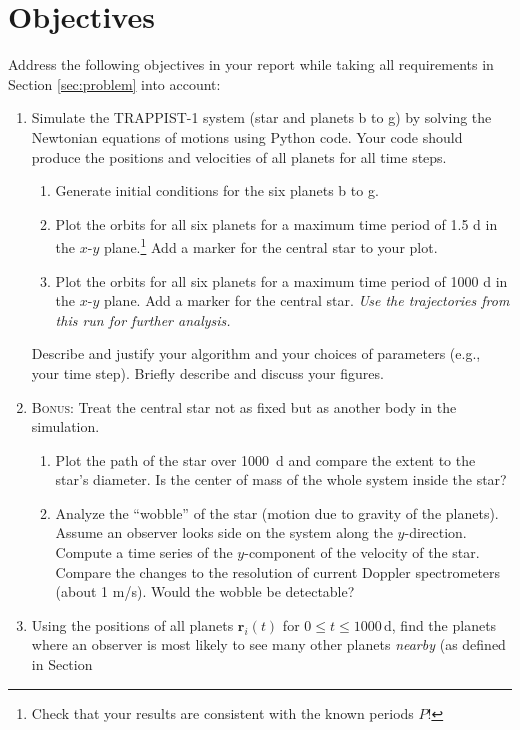 \documentclass[letterpaper]{scrartcl}
\newcommand{\BONUS}{\textsc{Bonus: }}
\newenvironment{enuma}{\begin{enumerate}[label=(\alph*)]}{\end{enumerate}}
\newenvironment{enumi}{\begin{enumerate}[label=(\roman*)]}{\end{enumerate}}
\renewcommand{\vec}[1]{\ensuremath{\mathbf{#1}}}
\begin{document}
\section{Objectives}
\label{sec:tasks}
Address the following objectives in your report while taking all
requirements in Section \ref{sec:problem} into account:
\begin{enuma}
\item Simulate the TRAPPIST-1 system (star and planets b to g) by
  solving the Newtonian equations of motions using Python code. Your
  code should produce the positions and velocities of all planets for
  all time steps.
  \begin{enumi}
  \item Generate initial conditions for the six planets b to g.
  \item Plot the orbits for all six planets for a maximum time period
    of 1.5 d in the $x$-$y$ plane.\footnote{Check that your results
      are consistent with the known periods $P$!} Add a marker for the
    central star to your plot.
  \item Plot the orbits for all six planets for a maximum time period
    of 1000 d in the $x$-$y$ plane. Add a marker for the central
    star. \emph{Use the trajectories from this run for further
      analysis.}
  \end{enumi}
  Describe and justify your algorithm and your choices of parameters (e.g., your
  time step). Briefly describe and discuss your figures.
\item \BONUS Treat the central star not as fixed but as another body
  in the simulation. 
  \begin{enumi}
  \item Plot the path of the star over 1000~d and compare the extent
    to the star's diameter. Is the center of mass of the whole system
    inside the star?
  \item Analyze the ``wobble'' of the star (motion due to gravity of
    the planets). Assume an observer looks side on the system along
    the $y$-direction. Compute a time series of the $y$-component of
    the velocity of the star. Compare the changes to the resolution
    of current Doppler spectrometers (about 1 m/s). Would the wobble
    be detectable?
  \end{enumi}
\item Using the positions of all planets $\vec{r}_{i}(t)$ for $0 \leq
  t \leq 1000\,\text{d}$, find the planets where an observer is most
  likely to see many other planets \emph{nearby} (as defined in Section

\end{enuma}
\end{document}
